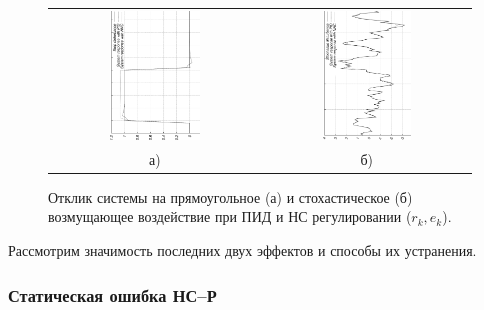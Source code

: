 \begin{figure}[h]
\begin{tabular}{cc}
\includegraphics[angle=270,width=0.45\textwidth,%
             totalheight=0.25\textheight]{pid_npc_step_test} &
\includegraphics[angle=270,width=0.45\textwidth,%
             totalheight=0.25\textheight]{pid_npc_stoch_test} \\
а) & б)\\
\end{tabular}
\caption{Отклик системы на прямоугольное (а) и стохастическое (б)
         возмущающее воздействие при ПИД и НС регулировании ($r_k,e_k$).}
\label{fig:pid_npc_test}
\end{figure}

Рассмотрим значимость последних двух эффектов и способы их устранения.

\subsubsection{Статическая ошибка НС--Р}%
\label{nnc_static_error}

